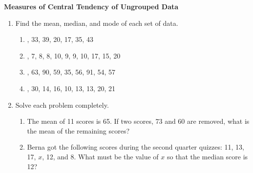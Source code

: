 \begin{center}
\textbf{Measures of Central Tendency of Ungrouped Data}\\
\end{center}

\vspace*{1ex}

\begin{enumerate}[label = \Alph*. ]
\item \hspce Find the mean, median, and mode  of each set of data.
\begin{enumerate}[label = \arabic*. ]
\item {}, 33, 39, 20, 17, 35, 43
\item {}, 7, 8, 8, 10, 9, 9, 10, 17, 15, 20
\item {}, 63, 90, 59, 35, 56, 91, 54, 57
\item {}, 30, 14, 16, 10, 13, 13, 20, 21

\end{enumerate}  

\item \hspce Solve each problem completely. 
\begin{enumerate}[label = \arabic*. ]
\item The mean of 11 scores is 65. If two scores, 73 and 60 are removed, what is the mean of the remaining scores?
\item Berna got the following scores during the second  quarter quizzes: 11, 13, 17, $x$, 12, and 8. What must be the value of $x$ so that the median score is 12?

\end{enumerate}   

\end{enumerate} 